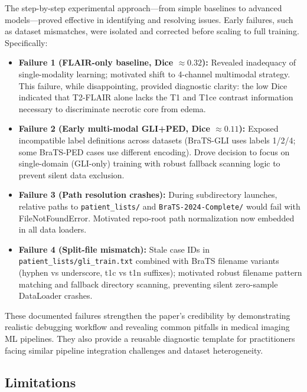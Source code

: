 \documentclass[conference]{IEEEtran}
\begin{document}
The step-by-step experimental approach—from simple baselines to advanced models—proved effective in identifying and resolving issues. Early failures, such as dataset mismatches, were isolated and corrected before scaling to full training. Specifically:

\begin{itemize}
\item \textbf{Failure 1 (FLAIR-only baseline, Dice $\approx 0.32$):} Revealed inadequacy of single-modality learning; motivated shift to 4-channel multimodal strategy. This failure, while disappointing, provided diagnostic clarity: the low Dice indicated that T2-FLAIR alone lacks the T1 and T1ce contrast information necessary to discriminate necrotic core from edema.
\item \textbf{Failure 2 (Early multi-modal GLI+PED, Dice $\approx 0.11$):} Exposed incompatible label definitions across datasets (BraTS-GLI uses labels 1/2/4; some BraTS-PED cases use different encoding). Drove decision to focus on single-domain (GLI-only) training with robust fallback scanning logic to prevent silent data exclusion.
\item \textbf{Failure 3 (Path resolution crashes):} During subdirectory launches, relative paths to \texttt{patient\_lists/} and \texttt{BraTS-2024-Complete/} would fail with FileNotFoundError. Motivated repo-root path normalization now embedded in all data loaders.
\item \textbf{Failure 4 (Split-file mismatch):} Stale case IDs in \texttt{patient\_lists/gli\_train.txt} combined with BraTS filename variants (hyphen vs underscore, t1c vs t1n suffixes); motivated robust filename pattern matching and fallback directory scanning, preventing silent zero-sample DataLoader crashes.
\end{itemize}

These documented failures strengthen the paper's credibility by demonstrating realistic debugging workflow and revealing common pitfalls in medical imaging ML pipelines. They also provide a reusable diagnostic template for practitioners facing similar pipeline integration challenges and dataset heterogeneity.

\subsection{Limitations}
\end{document}

